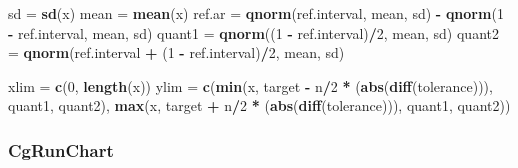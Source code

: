 \documentclass[
]{book}
\newenvironment{Shaded}{\begin{snugshade}}{\end{snugshade}}
\newcommand{\DecValTok}[1]{\textcolor[rgb]{0.00,0.00,0.81}{#1}}
\newcommand{\FunctionTok}[1]{\textcolor[rgb]{0.13,0.29,0.53}{\textbf{#1}}}
\newcommand{\NormalTok}[1]{#1}
\newcommand{\OtherTok}[1]{\textcolor[rgb]{0.56,0.35,0.01}{#1}}
\newcommand{\SpecialCharTok}[1]{\textcolor[rgb]{0.81,0.36,0.00}{\textbf{#1}}}
\begin{document}
\begin{Shaded}
\begin{Highlighting}[]
\NormalTok{sd }\OtherTok{=} \FunctionTok{sd}\NormalTok{(x)}
\NormalTok{  mean }\OtherTok{=} \FunctionTok{mean}\NormalTok{(x)}
\NormalTok{  ref.ar }\OtherTok{=} \FunctionTok{qnorm}\NormalTok{(ref.interval, mean, sd) }\SpecialCharTok{{-}} \FunctionTok{qnorm}\NormalTok{(}\DecValTok{1} \SpecialCharTok{{-}}\NormalTok{ ref.interval, }
\NormalTok{                                                 mean, sd)}
\NormalTok{quant1 }\OtherTok{=} \FunctionTok{qnorm}\NormalTok{((}\DecValTok{1} \SpecialCharTok{{-}}\NormalTok{ ref.interval)}\SpecialCharTok{/}\DecValTok{2}\NormalTok{, mean, sd)}
\NormalTok{  quant2 }\OtherTok{=} \FunctionTok{qnorm}\NormalTok{(ref.interval }\SpecialCharTok{+}\NormalTok{ (}\DecValTok{1} \SpecialCharTok{{-}}\NormalTok{ ref.interval)}\SpecialCharTok{/}\DecValTok{2}\NormalTok{, mean, }
\NormalTok{                 sd)}


\NormalTok{xlim }\OtherTok{=} \FunctionTok{c}\NormalTok{(}\DecValTok{0}\NormalTok{, }\FunctionTok{length}\NormalTok{(x))}
\NormalTok{ylim }\OtherTok{=} \FunctionTok{c}\NormalTok{(}\FunctionTok{min}\NormalTok{(x, target }\SpecialCharTok{{-}}\NormalTok{ n}\SpecialCharTok{/}\DecValTok{2} \SpecialCharTok{*}\NormalTok{ (}\FunctionTok{abs}\NormalTok{(}\FunctionTok{diff}\NormalTok{(tolerance))), }
\NormalTok{             quant1, quant2), }\FunctionTok{max}\NormalTok{(x, target }\SpecialCharTok{+}\NormalTok{ n}\SpecialCharTok{/}\DecValTok{2} \SpecialCharTok{*}\NormalTok{ (}\FunctionTok{abs}\NormalTok{(}\FunctionTok{diff}\NormalTok{(tolerance))), }
\NormalTok{                                  quant1, quant2))}
\end{Highlighting}
\end{Shaded}

\hypertarget{cgrunchart}{%
\subsubsection{CgRunChart}\label{cgrunchart}}
\end{document}
